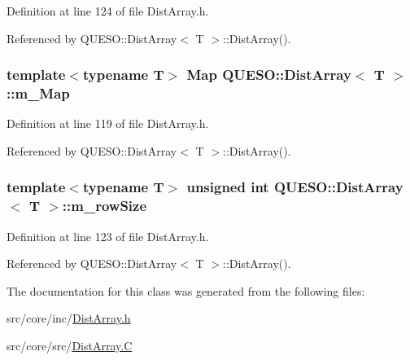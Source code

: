 Definition at line 124 of file Dist\-Array.\-h.



Referenced by Q\-U\-E\-S\-O\-::\-Dist\-Array$<$ T $>$\-::\-Dist\-Array().

\hypertarget{class_q_u_e_s_o_1_1_dist_array_aeb1c8299dc302d01ae2fbdafb82b7b37}{
\subsubsection[{m\-\_\-\-Map}]{\setlength{\rightskip}{0pt plus 5cm}template$<$typename T$>$ {\bf Map} {\bf Q\-U\-E\-S\-O\-::\-Dist\-Array}$<$ T $>$\-::m\-\_\-\-Map\hspace{0.3cm}{\ttfamily [private]}}}\label{class_q_u_e_s_o_1_1_dist_array_aeb1c8299dc302d01ae2fbdafb82b7b37}


Definition at line 119 of file Dist\-Array.\-h.



Referenced by Q\-U\-E\-S\-O\-::\-Dist\-Array$<$ T $>$\-::\-Dist\-Array().

\hypertarget{class_q_u_e_s_o_1_1_dist_array_a663f89dc740471dafcf8b526c255d385}{
\subsubsection[{m\-\_\-row\-Size}]{\setlength{\rightskip}{0pt plus 5cm}template$<$typename T$>$ unsigned int {\bf Q\-U\-E\-S\-O\-::\-Dist\-Array}$<$ T $>$\-::m\-\_\-row\-Size\hspace{0.3cm}{\ttfamily [private]}}}\label{class_q_u_e_s_o_1_1_dist_array_a663f89dc740471dafcf8b526c255d385}


Definition at line 123 of file Dist\-Array.\-h.



Referenced by Q\-U\-E\-S\-O\-::\-Dist\-Array$<$ T $>$\-::\-Dist\-Array().



The documentation for this class was generated from the following files\-:\begin{DoxyCompactItemize}
\item 
src/core/inc/\hyperlink{_dist_array_8h}{Dist\-Array.\-h}\item 
src/core/src/\hyperlink{_dist_array_8_c}{Dist\-Array.\-C}\end{DoxyCompactItemize}
